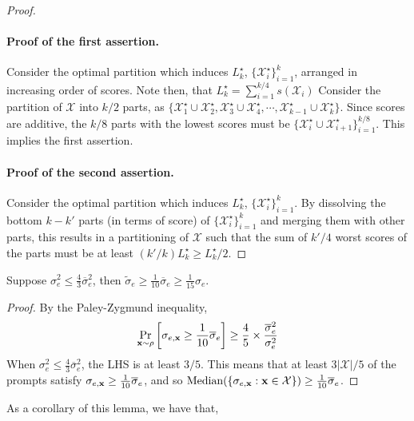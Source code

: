\begin{proof}
\paragraph{Proof of the first assertion.}  Consider the optimal partition which induces $L_k^\star$, $\{ \mathcal{X}^\star_i \}_{i=1}^k$, arranged in increasing order of scores. Note then, that $L^\star_k = \sum_{i=1}^{ k/4 } s(\mathcal{X}_i)$ Consider the partition of $\mathcal{X}$ into $k/2$ parts, as $\{ \mathcal{X}_1^\star \cup \mathcal{X}_2^\star, \mathcal{X}_3^\star \cup \mathcal{X}_4^\star, \cdots, \mathcal{X}_{k-1}^\star \cup \mathcal{X}_k^\star \}$. Since scores are additive, the $k/8$ parts with the lowest scores must be $\{ \mathcal{X}_i^\star \cup \mathcal{X}_{i+1}^\star \}_{i=1}^{k/8}$. This implies the first assertion.

\paragraph{Proof of the second assertion.} Consider the optimal partition which induces $L_k^\star$, $\{ \mathcal{X}^\star_i \}_{i=1}^k$. By dissolving the bottom $k-k'$ parts (in terms of score) of $\{ \mathcal{X}^\star_i \}_{i=1}^k$ and merging them with other parts, this results in a partitioning of $\mathcal{X}$ such that the sum of $k'/4$ worst scores of the parts must be at least $(k'/k) L_k^\star \ge L_k^\star/2$.


\end{proof}

\begin{lemma}
Suppose $\sigma_e^2 \le \frac{4}{3} \overline{\sigma}_e^2$, then $\widetilde{\sigma}_e \ge \frac{1}{10} \overline{\sigma}_e \ge \frac{1}{15} \sigma_e$.
\end{lemma}
\begin{proof}
By the Paley-Zygmund inequality,
\begin{align}
\Pr_{\mathbf{x} \sim \rho} \left[ \sigma_{e,\mathbf{x}} \ge \frac{1}{10} \overline{\sigma}_e \right] \ge \frac{4}{5} \times \frac{\overline{\sigma}_e^2}{\sigma_e^2}
\end{align}
When $\sigma_e^2 \le \frac{4}{3} \overline{\sigma}_e^2$, the LHS is at least $3/5$. This means that at least $3|\mathcal{X}|/5$ of the prompts satisfy $\sigma_{e,\mathbf{x}} \ge \frac{1}{10} \overline{\sigma}_e$, and so $\text{Median} ( \{ \sigma_{e,\mathbf{x}} : \mathbf{x} \in \mathcal{X} \} ) \ge \frac{1}{10} \overline{\sigma}_e$.
\end{proof}

As a corollary of this lemma, we have that,

